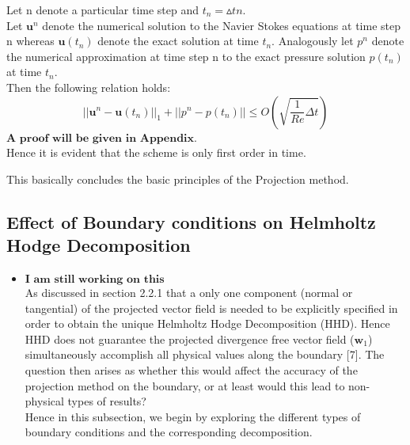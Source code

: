 \begin{theorem}
Let n denote a particular time step and $t_n = \vartriangle t n$.\\
Let $\textbf{u}^n$ denote the numerical solution to the Navier Stokes equations at time step n whereas $\textbf{u} (t_n)$ denote the exact solution at time $t_n$. Analogously let $\textit{p}^n$ denote the numerical approximation at time step n to the exact pressure solution $\textit{p} (t_n)$ at time $t_n$.\\
Then the following relation holds:
\begin{equation}
|| \textbf{u}^n - \textbf{u} (t_n)||_1 + || \textit{p}^n - \textit{p} (t_n)|| \leq O(\sqrt{\dfrac{1}{Re} \Delta t})
\end{equation}
$\textbf{A proof will be given in Appendix}$.\\
Hence it is evident that the scheme is only first order in time.
\end{theorem}

This basically concludes the basic principles of the Projection method.

\subsection{Effect of Boundary conditions on Helmholtz Hodge Decomposition}
\begin{itemize}
\item
$\textbf{I am still working on this}$\\
As discussed in section 2.2.1 that a only one component (normal or tangential) of the projected vector field is needed to be explicitly specified in order to obtain the unique Helmholtz Hodge Decomposition (HHD). Hence HHD does not guarantee the projected divergence free vector field ($\textbf{w}_1$) simultaneously accomplish all physical values along the boundary [7]. The question then arises as whether this would affect the accuracy of the projection method on the boundary, or at least would this lead to non-physical types of results?\\
Hence in this subsection, we begin by exploring the different types of boundary conditions and the corresponding decomposition.
\end{itemize}

